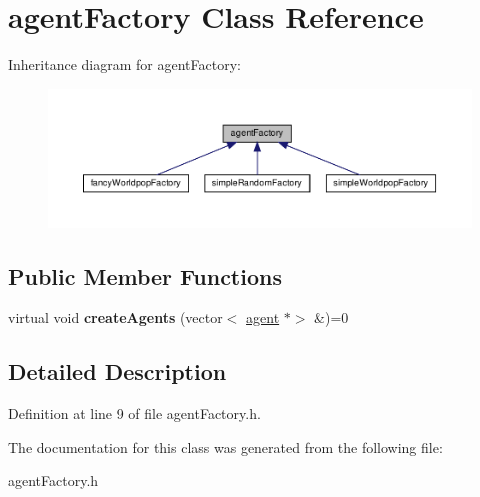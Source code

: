 \hypertarget{classagentFactory}{}\section{agent\+Factory Class Reference}
\label{classagentFactory}


Inheritance diagram for agent\+Factory\+:
\nopagebreak
\begin{figure}[H]
\begin{center}
\leavevmode
\includegraphics[width=350pt]{classagentFactory__inherit__graph}
\end{center}
\end{figure}
\subsection*{Public Member Functions}
\begin{DoxyCompactItemize}
\item 
\mbox{\label{classagentFactory_ab3b48ba713d17c58995adbff5f0dbb9b}} 
virtual void {\bfseries create\+Agents} (vector$<$ \mbox{\hyperlink{classagent}{agent}} $\ast$$>$ \&)=0
\end{DoxyCompactItemize}


\subsection{Detailed Description}


Definition at line 9 of file agent\+Factory.\+h.



The documentation for this class was generated from the following file\+:\begin{DoxyCompactItemize}
\item 
agent\+Factory.\+h\end{DoxyCompactItemize}
